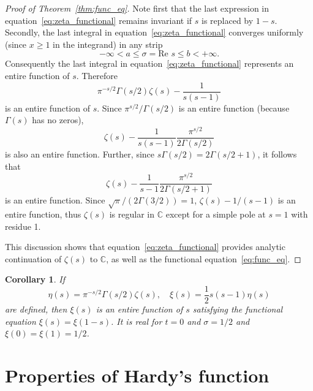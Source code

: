 \documentclass[11pt]{article}
\newtheorem{corollary}[theorem]{Corollary}
\begin{document}
\begin{proof}[Proof of Theorem~\ref{thm:func_eq}]
Note first that the last expression in equation~\eqref{eq:zeta_functional} remains invariant if $s$ is replaced by $1-s$. Secondly, the last integral in equation~\eqref{eq:zeta_functional} converges uniformly (since $x \geq 1$ in the integrand) in any strip
\begin{equation}\label{eq:strip}
-\infty < a \leq \sigma = \text{Re } s \leq b < +\infty.
\end{equation}
Consequently the last integral in equation~\eqref{eq:zeta_functional} represents an entire function of $s$. Therefore
\begin{equation}\label{eq:entire_part}
\pi^{-s/2} \Gamma(s/2) \zeta(s) - \frac{1}{s(s-1)}
\end{equation}
is an entire function of $s$. Since $\pi^{s/2}/\Gamma(s/2)$ is an entire function (because $\Gamma(s)$ has no zeros),
\begin{equation}\label{eq:zeta_entire}
\zeta(s) - \frac{1}{s(s-1)} \frac{\pi^{s/2}}{2\Gamma(s/2)}
\end{equation}
is also an entire function. Further, since $s\Gamma(s/2) = 2\Gamma(s/2 + 1)$, it follows that
\begin{equation}\label{eq:zeta_pole}
\zeta(s) - \frac{1}{s-1} \frac{\pi^{s/2}}{2\Gamma(s/2 + 1)}
\end{equation}
is an entire function. Since $\sqrt{\pi}/(2\Gamma(3/2)) = 1$, $\zeta(s) - 1/(s-1)$ is an entire function, thus $\zeta(s)$ is regular in $\mathbb{C}$ except for a simple pole at $s = 1$ with residue 1.

This discussion shows that equation~\eqref{eq:zeta_functional} provides analytic continuation of $\zeta(s)$ to $\mathbb{C}$, as well as the functional equation~\eqref{eq:func_eq}.
\end{proof}

\begin{corollary}\label{cor:xi_function}
If
\begin{equation}\label{eq:eta_xi_def}
\eta(s) = \pi^{-s/2} \Gamma(s/2) \zeta(s), \quad \xi(s) = \frac{1}{2} s(s-1) \eta(s)
\end{equation}
are defined, then $\xi(s)$ is an entire function of $s$ satisfying the functional equation $\xi(s) = \xi(1-s)$. It is real for $t = 0$ and $\sigma = 1/2$ and $\xi(0) = \xi(1) = 1/2$.
\end{corollary}

\section{Properties of Hardy's function}\label{sec:hardy}
\end{document}
